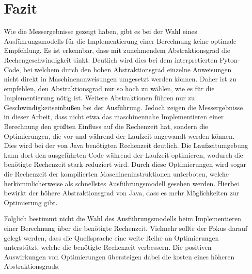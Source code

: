 \documentclass[11pt, parskip=half]{scrartcl}       %
\begin{document}
\section{Fazit}

Wie die Messergebnisse gezeigt haben, gibt es bei der Wahl eines Ausführungsmodells für die Implementierung einer Berechnung keine optimale Empfehlung.
Es ist erkennbar, dass mit zunehmendem Abstraktionsgrad die Rechengeschwindigkeit sinkt.
Deutlich wird dies bei dem interpretierten Pyton-Code, bei welchem durch den hohen Abstraktionsgrad einzelne Anweisungen nicht direkt in Maschinenanweisungen umgesetzt werden können.
Daher ist zu empfehlen, den Abstraktionsgrad nur so hoch zu wählen, wie es für die Implementierung nötig ist.
Weitere Abstraktionen führen nur zu Geschwindigkeitseinbußen bei der Ausführung.
Jedoch zeigen die Messergebnisse in dieser Arbeit, dass nicht etwa das maschinennahe Implementieren einer Berechnung den größten Einfluss auf die Rechenzeit hat, sondern die Optimierungen, die vor und während der Laufzeit angewandt werden können.
Dies wird bei der von Java benötigten Rechenzeit deutlich.
Die Laufzeitumgebung kann dort den ausgeführten Code während der Laufzeit optimieren, wodurch die benötigte Rechenzeit stark reduziert wird.
Durch diese Optimierungen wird sogar die Rechenzeit der kompilierten Maschineninstruktionen unterboten, welche herkömmlicherweise als schnellstes Ausführungsmodell gesehen werden.
Hierbei bewirkt der höhere Abstraktionsgrad von Java, dass es mehr Möglichkeiten zur Optimierung gibt.

Folglich bestimmt nicht die Wahl des Ausführungsmodells beim Implementieren einer Berechnung über die benötigte Rechenzeit.
Vielmehr sollte der Fokus darauf gelegt werden, dass die Quellsprache eine weite Reihe an Optimierungen unterstützt, welche die benötigte Rechenzeit verbessern.
Die positiven Auswirkungen von Optimierungen übersteigen dabei die kosten eines höheren Abstraktionsgrads.

\newpage

{}

\end{document}
